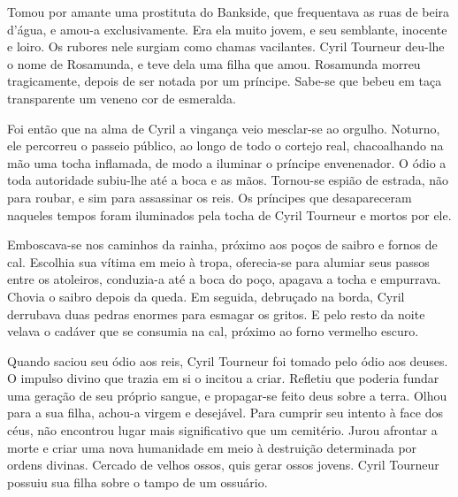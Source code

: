 Tomou por amante uma prostituta do Bankside, que frequentava as ruas de
beira d’água, e amou-a exclusivamente. Era ela muito jovem, e seu
semblante, inocente e loiro. Os rubores nele surgiam como chamas
vacilantes. Cyril Tourneur deu-lhe o nome de Rosamunda, e teve dela uma
filha que amou. Rosamunda morreu tragicamente, depois de ser notada por um
príncipe. Sabe-se que bebeu em taça transparente um veneno cor de
esmeralda.

Foi então que na alma de Cyril a vingança veio mesclar-se ao orgulho.
Noturno, ele percorreu o passeio público, ao longo de todo o cortejo real,
chacoalhando na mão uma tocha inflamada, de modo a iluminar o príncipe
envenenador. O ódio a toda autoridade subiu-lhe até a boca e as mãos.
Tornou-se espião de estrada, não para roubar, e sim para assassinar os
reis. Os príncipes que desapareceram naqueles tempos foram iluminados pela
tocha de Cyril Tourneur e mortos por ele.

Emboscava-se nos caminhos da rainha, próximo aos poços de saibro e fornos
de cal. Escolhia sua vítima em meio à tropa, oferecia-se para alumiar seus
passos entre os atoleiros, conduzia-a até a boca do poço, apagava a tocha
e empurrava. Chovia o saibro depois da queda. Em seguida, debruçado na
borda, Cyril derrubava duas pedras enormes para esmagar os gritos. E pelo
resto da noite velava o cadáver que se consumia na cal, próximo ao forno
vermelho escuro.

Quando saciou seu ódio aos reis, Cyril Tourneur foi tomado pelo ódio aos
deuses. O impulso divino que trazia em si o incitou a criar. Refletiu que
poderia fundar uma geração de seu próprio sangue, e propagar-se feito deus
sobre a terra. Olhou para a sua filha, achou-a virgem e desejável. Para
cumprir seu intento à face dos céus, não encontrou lugar mais
significativo que um cemitério. Jurou afrontar a morte e criar uma nova
humanidade em meio à destruição determinada por ordens divinas. Cercado de
velhos ossos, quis gerar ossos jovens. Cyril Tourneur possuiu sua filha
sobre o tampo de um ossuário.

